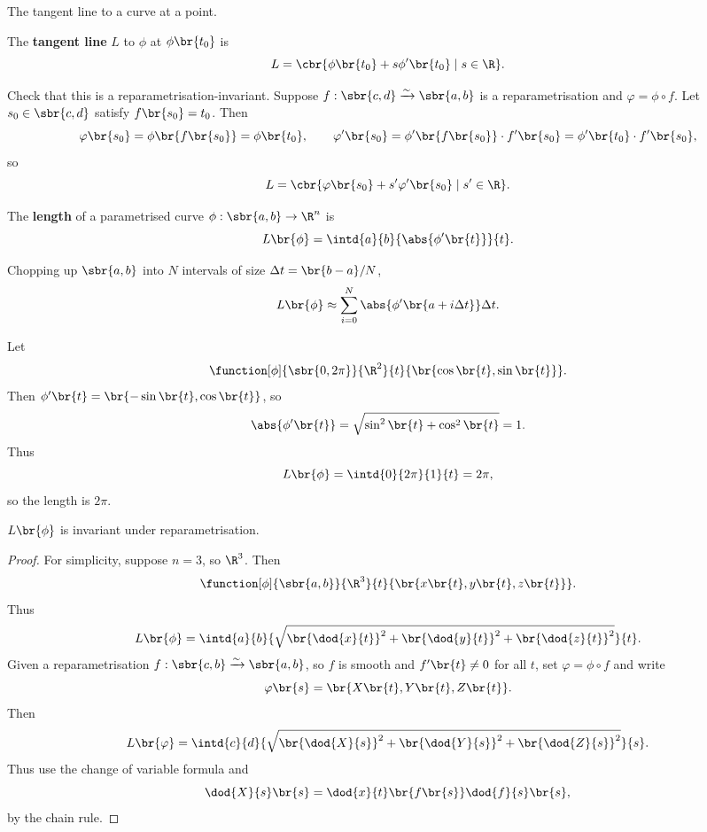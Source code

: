 \begin{example*}
The tangent line to a curve at a point.
\end{example*}

\begin{definition}
The \textbf{tangent line} $ L $ to $ \phi $ at $ \phi\br{t_0} $ is
$$ L = \cbr{\phi\br{t_0} + s\phi'\br{t_0} \mid s \in \R}. $$
\end{definition}

Check that this is a reparametrisation-invariant. Suppose $ f : \sbr{c, d} \xrightarrow{\sim} \sbr{a, b} $ is a reparametrisation and $ \varphi = \phi \circ f $. Let $ s_0 \in \sbr{c, d} $ satisfy $ f\br{s_0} = t_0 $. Then
$$ \varphi\br{s_0} = \phi\br{f\br{s_0}} = \phi\br{t_0}, \qquad \varphi'\br{s_0} = \phi'\br{f\br{s_0}} \cdot f'\br{s_0} = \phi'\br{t_0} \cdot f'\br{s_0}, $$
so
$$ L = \cbr{\varphi\br{s_0} + s'\varphi'\br{s_0} \mid s' \in \R}. $$

\begin{definition}
The \textbf{length} of a parametrised curve $ \phi : \sbr{a, b} \to \R^n $ is
$$ L\br{\phi} = \intd{a}{b}{\abs{\phi'\br{t}}}{t}. $$
\end{definition}

Chopping up $ \sbr{a, b} $ into $ N $ intervals of size $ \Delta t = \br{b - a} / N $,
$$ L\br{\phi} \approx \sum_{i = 0}^N \abs{\phi'\br{a + i\Delta t}}\Delta t. $$

\begin{example*}
Let
$$ \function[\phi]{\sbr{0, 2\pi}}{\R^2}{t}{\br{\cos\br{t}, \sin\br{t}}}. $$
Then $ \phi'\br{t} = \br{-\sin\br{t}, \cos\br{t}} $, so
$$ \abs{\phi'\br{t}} = \sqrt{\sin^2\br{t} + \cos^2\br{t}} = 1. $$
Thus
$$ L\br{\phi} = \intd{0}{2\pi}{1}{t} = 2\pi, $$
so the length is $ 2\pi $.
\end{example*}

\pagebreak

\begin{proposition}
$ L\br{\phi} $ is invariant under reparametrisation.
\end{proposition}

\begin{proof}
For simplicity, suppose $ n = 3 $, so $ \R^3 $. Then
$$ \function[\phi]{\sbr{a, b}}{\R^3}{t}{\br{x\br{t}, y\br{t}, z\br{t}}}. $$
Thus
$$ L\br{\phi} = \intd{a}{b}{\sqrt{\br{\dod{x}{t}}^2 + \br{\dod{y}{t}}^2 + \br{\dod{z}{t}}^2}}{t}. $$
Given a reparametrisation $ f : \sbr{c, b} \xrightarrow{\sim} \sbr{a, b} $, so $ f $ is smooth and $ f'\br{t} \ne 0 $ for all $ t $, set $ \varphi = \phi \circ f $ and write
$$ \varphi\br{s} = \br{X\br{t}, Y\br{t}, Z\br{t}}. $$
Then
$$ L\br{\varphi} = \intd{c}{d}{\sqrt{\br{\dod{X}{s}}^2 + \br{\dod{Y}{s}}^2 + \br{\dod{Z}{s}}^2}}{s}. $$
Thus use the change of variable formula and
$$ \dod{X}{s}\br{s} = \dod{x}{t}\br{f\br{s}}\dod{f}{s}\br{s}, $$
by the chain rule.
\end{proof}

